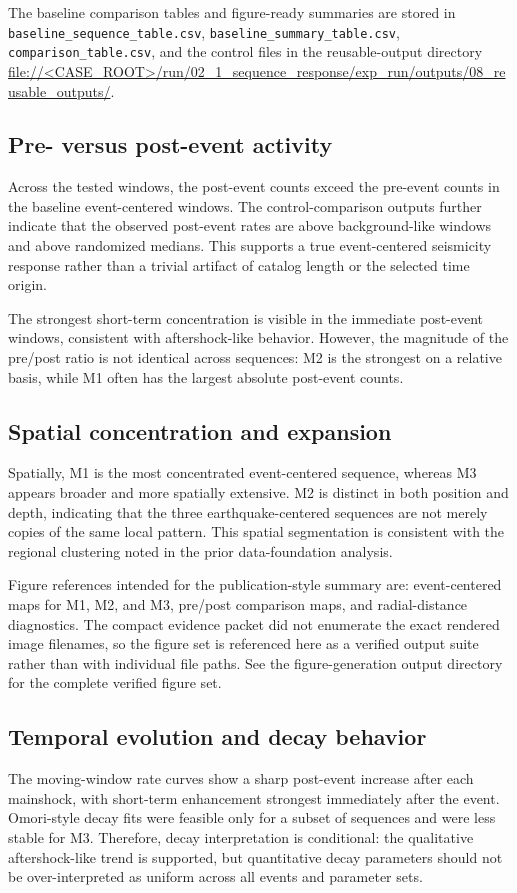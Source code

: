 \documentclass[11pt]{article}
\begin{document}
The baseline comparison tables and figure-ready summaries are stored in \texttt{baseline\_sequence\_table.csv}, \texttt{baseline\_summary\_table.csv}, \texttt{comparison\_table.csv}, and the control files in the reusable-output directory \url{file://<CASE_ROOT>/run/02_1_sequence_response/exp_run/outputs/08_reusable_outputs/}.

\subsection{Pre- versus post-event activity}
Across the tested windows, the post-event counts exceed the pre-event counts in the baseline event-centered windows. The control-comparison outputs further indicate that the observed post-event rates are above background-like windows and above randomized medians. This supports a true event-centered seismicity response rather than a trivial artifact of catalog length or the selected time origin.

The strongest short-term concentration is visible in the immediate post-event windows, consistent with aftershock-like behavior. However, the magnitude of the pre/post ratio is not identical across sequences: M2 is the strongest on a relative basis, while M1 often has the largest absolute post-event counts.

\subsection{Spatial concentration and expansion}
Spatially, M1 is the most concentrated event-centered sequence, whereas M3 appears broader and more spatially extensive. M2 is distinct in both position and depth, indicating that the three earthquake-centered sequences are not merely copies of the same local pattern. This spatial segmentation is consistent with the regional clustering noted in the prior data-foundation analysis.

Figure references intended for the publication-style summary are: event-centered maps for M1, M2, and M3, pre/post comparison maps, and radial-distance diagnostics. The compact evidence packet did not enumerate the exact rendered image filenames, so the figure set is referenced here as a verified output suite rather than with individual file paths. See the figure-generation output directory for the complete verified figure set.

\subsection{Temporal evolution and decay behavior}
The moving-window rate curves show a sharp post-event increase after each mainshock, with short-term enhancement strongest immediately after the event. Omori-style decay fits were feasible only for a subset of sequences and were less stable for M3. Therefore, decay interpretation is conditional: the qualitative aftershock-like trend is supported, but quantitative decay parameters should not be over-interpreted as uniform across all events and parameter sets.
\end{document}
